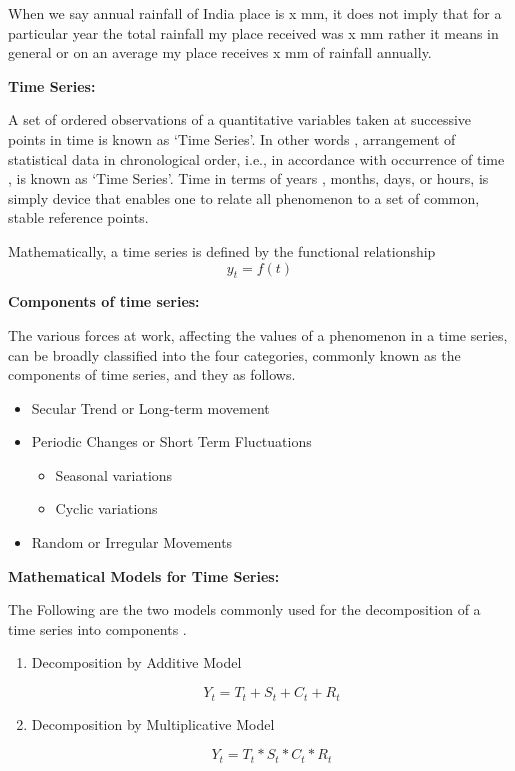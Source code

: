 \documentclass[12pt,openany]{book}
\providecommand{\tightlist}{%
  \setlength{\itemsep}{0pt}\setlength{\parskip}{0pt}}
\begin{document}
When we say annual rainfall of India place is x mm, it does not imply that for a particular year the total rainfall my place received was x mm rather it means in general or on an average my place receives x mm of rainfall annually.

\textbf{Time Series:}

A set of ordered observations of a quantitative variables taken at successive points in time is known as `Time Series'. In other words , arrangement of statistical data in chronological order, i.e., in accordance with occurrence of time , is known as `Time Series'. Time in terms of years , months, days, or hours, is simply device that enables one to relate all phenomenon to a set of common, stable reference points.

Mathematically, a time series is defined by the functional relationship
\[y_t =f(t)\]

\textbf{Components of time series:}

The various forces at work, affecting the values of a phenomenon in a time series, can be broadly classified into the four categories, commonly known as the components of time series, and they as follows.

\begin{itemize}
\tightlist
\item
  Secular Trend or Long-term movement
\item
  Periodic Changes or Short Term Fluctuations

  \begin{itemize}
  \tightlist
  \item
    Seasonal variations
  \item
    Cyclic variations
  \end{itemize}
\item
  Random or Irregular Movements
\end{itemize}

\textbf{Mathematical Models for Time Series:}

The Following are the two models commonly used for the decomposition of a time series into components .

\begin{enumerate}
\def\labelenumi{\arabic{enumi}.}
\item
  Decomposition by Additive Model

  \[Y_t = T_t+S_t+C_t+R_t\]
\item
  Decomposition by Multiplicative Model

  \[Y_t = T_t*S_t*C_t*R_t\]
\end{enumerate}
\end{document}

